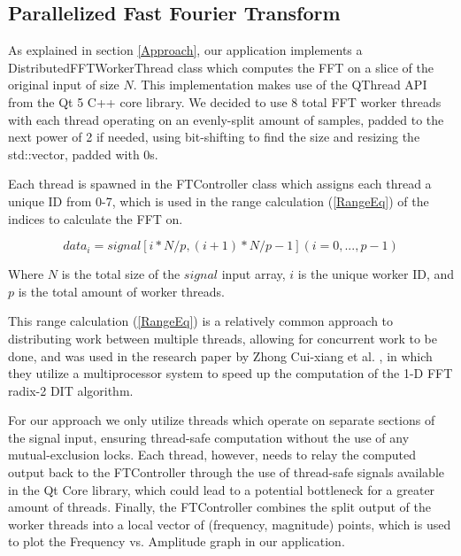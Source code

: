 \documentclass[journal]{IEEEtran}
\begin{document}
\subsection{Parallelized Fast Fourier Transform}
		\par{
			As explained in section \ref{Approach}, our application implements
			a DistributedFFTWorkerThread class which computes the FFT on a
			slice of the original input of size $N$. This implementation makes use
			of the QThread API from the Qt 5 C++ core library. We decided to use 8
			total FFT worker threads with each thread operating on an evenly-split
			amount of samples, padded to the next power of 2 if needed, using
			bit-shifting to find the size and resizing the std::vector, padded with
			0s.

			Each thread is spawned in the FTController class which assigns each thread
			a unique ID from 0-7, which is used in the range calculation
			(\ref{RangeEq}) of the indices to calculate the FFT on. 
			
			\begin{equation}\label{RangeEq}
				data_i = signal[i*N/p, (i+1)*N/p - 1] (i = 0, ..., p-1)
			\end{equation}

			Where $N$ is the total size of the $signal$ input array,
			$i$ is the unique worker ID, and $p$ is the total amount of worker
			threads.

			This range calculation (\ref{RangeEq}) is a relatively common
			approach to distributing work between multiple threads, allowing for
			concurrent work to be done, and was used in the research paper by 
			Zhong Cui-xiang et al. \cite{Xiang}, in which they utilize a 
			multiprocessor system to speed up the computation of the 1-D
			FFT radix-2 DIT algorithm.

			For our approach we only utilize threads which operate on separate
			sections of the signal input, ensuring thread-safe computation
			without the use of any mutual-exclusion locks. Each thread, however,
			needs to relay the computed output back to the FTController through
			the use of thread-safe signals available in the Qt Core library, 
			which could lead to a potential bottleneck for a greater amount of
			threads. Finally, the FTController combines the split output of the worker
			threads into a local vector of (frequency, magnitude) points, which
			is used to plot the Frequency vs. Amplitude graph in our application.
		}
\end{document}
